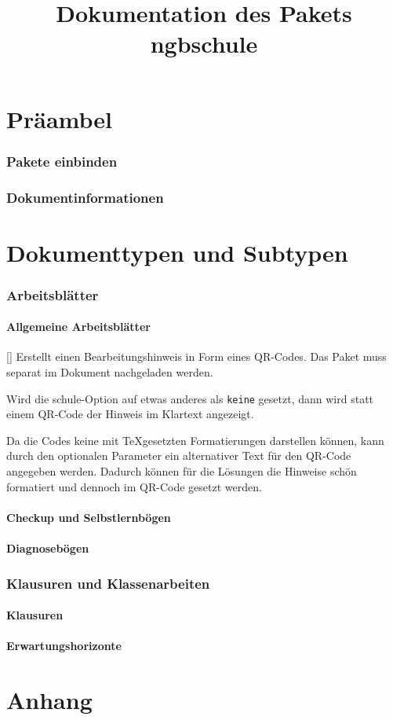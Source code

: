 \documentclass[a4paper,add-index,ngerman]{cnltx-doc}
\title{Dokumentation des Pakets ngbschule}
\begin{document}


\part{Präambel}
\section{Pakete einbinden}
\section{Dokumentinformationen}



\part{Dokumenttypen und Subtypen}
\section{Arbeitsblätter}
\subsection{Allgemeine Arbeitsblätter}
\begin{commands}
	[]
	Erstellt einen Bearbeitungshinweis in Form eines QR-Codes. Das Paket  muss separat im Dokument nachgeladen werden.
	
	Wird die schule-Option  auf etwas anderes als \texttt{keine} gesetzt, dann wird statt einem QR-Code der Hinweis im Klartext angezeigt.
	
	Da die Codes keine mit \TeX gesetzten Formatierungen darstellen können, kann durch den optionalen Parameter  ein alternativer Text für den QR-Code angegeben werden. Dadurch können für die Lösungen die Hinweise schön formatiert und dennoch im QR-Code gesetzt werden.
\end{commands}

\subsection{Checkup und Selbstlernbögen}
\subsection{Diagnosebögen}

\section{Klausuren und Klassenarbeiten}
\subsection{Klausuren}
\subsection{Erwartungshorizonte}



\part{Anhang}
\end{document}
